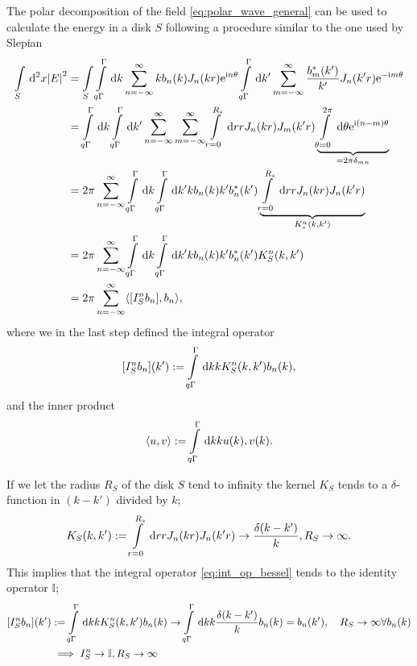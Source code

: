 \documentclass[11pt,a4paper, 
swedish,english %
]{article}
\begin{document}
The polar decomposition of the field \eqref{eq:polar_wave_general} can
be used to calculate the energy in a disk $S$ following a procedure
similar to the one used by Slepian \cite{PSWF-IV_1964}
\begin{equation}
  \label{eq:energy_bessel}
\begin{aligned}
\int_S \id^2x \abs{E}^2&= \int_S \int_{q\Gamma}^\Gamma \id k \sum_{n= -\infty}^{\infty} kb_n(k) J_n(kr)\ee^{\ii n \theta} \int_{q\Gamma}^\Gamma \id k' \sum_{m= -\infty}^{\infty} \frac{b_m^*(k')}{k'} J_n(k'r)\ee^{-\ii m \theta}\\
&=\int_{q\Gamma}^\Gamma \id k \int_{q\Gamma}^\Gamma \id k' \sum_{n= -\infty}^{\infty} \sum_{m= -\infty}^{\infty} \int_{r=0}^{R_s} \id r r J_n(kr)J_m(k'r)\underbrace{\int_{\theta=0}^{2\pi} \id \theta \ee^{\ii (n-m) \theta}}_{=2\pi \delta_{mn}}\\
&=2\pi \sum_{n=-\infty}^{\infty} \int_{q\Gamma}^\Gamma \id k \int_{q\Gamma}^\Gamma \id k'  kb_n(k) k'b_n^*(k') \underbrace{\int_{r=0}^{R_s} \id r r J_n(kr) J_n(k'r)}_{K_s^n(k,k')}\\
&=2\pi \sum_{n=-\infty}^{\infty} \int_{q\Gamma}^\Gamma \id k \int_{q\Gamma}^\Gamma \id k'  kb_n(k) k'b_n^*(k') K_S^n(k,k')\\
&=2\pi \sum_{n=-\infty}^{\infty} \langle [I_S^nb_n],b_n \rangle,
\end{aligned}
\end{equation}
where we in the last step defined the integral operator
\begin{equation}
  \label{eq:int_op_bessel}
[I_S^nb_n](k'):=\int_{q\Gamma}^\Gamma \id k k K_S^n(k,k')b_n(k),
\end{equation}
and the inner product
\begin{equation}
  \label{eq:in_prod_bessel}
\langle u,v \rangle := \int_{q\Gamma}^\Gamma \id k k u(k), v(k).
\end{equation}

If we let the radius $R_S$ of the disk $S$ tend to infinity the kernel $K_S$ tends to a $\delta$-function in $(k-k')$ divided by $k$;
\begin{equation*}
K_S(k,k')  := \int_{r=0}^{R_s} \id r r J_n(kr) J_n(k'r) \to \frac{\delta(k-k')}{k}, R_S \to \infty.
  \end{equation*}
This implies that the integral operator \ref{eq:int_op_bessel} tends to the identity operator $\mathbb{I}$;
\begin{equation*}
  \begin{aligned}
    [I_S^nb_n](k')&:=\int_{q\Gamma}^\Gamma \id k k K_S^n(k,k')b_n(k) \to \int_{q\Gamma}^\Gamma \id k k \frac{\delta(k-k')}{k}b_n(k)
    =b_n(k') \qc R_S \to \infty \forall b_n(k)\\
  &\implies I_S^n \to \mathbb{I}, R_S \to \infty
   \end{aligned}
\end{equation*}
\end{document}
